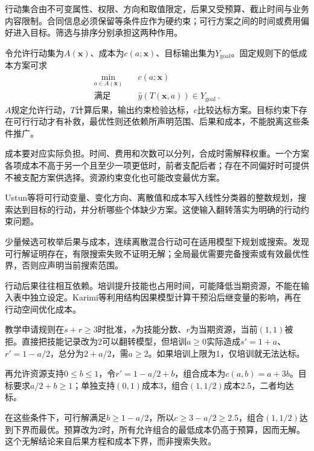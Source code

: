 行动集合由不可变属性、权限、方向和取值限定，后果又受预算、截止时间与业务内容限制。合同信息必须保留等条件应作为硬约束；可行方案之间的时间或费用偏好进入目标。筛选与排序分别承担这两种作用。

令允许行动集为$A(\bm x)$、成本为$c(a;\bm x)$、目标输出集为$Y_{\mathrm{goal}}$。固定规则下的低成本方案可求
\begin{equation}
 \begin{aligned}
 \min_{a\in A(\bm{x})}\quad &c(a;\bm{x})\\
 \text{满足}\quad &\hat y(T(\bm{x},a))\in Y_{\mathrm{goal}}\, .
 \end{aligned}
 \label{eq:interpretability-recourse}
\end{equation}
$A$规定允许行动，$T$计算后果，输出约束检验达标，$c$比较达标方案。目标约束下存在可行行动才有补救，最优性则还依赖所声明范围、后果和成本，不能脱离这些条件推广。

成本要对应实际负担。时间、费用和次数可以分列，合成时需解释权重。一个方案各项成本不高于另一个且至少一项更低时，前者支配后者；存在不同偏好时可提供不被支配方案供选择。资源约束变化也可能改变最优方案。

Ustun等将可行动变量、变化方向、离散值和成本写入线性分类器的整数规划，搜索达到目标的行动，并分析哪些个体缺少方案。这使输入翻转落实为明确的行动约束问题。

少量候选可枚举后果与成本，连续离散混合行动可在适用模型下规划或搜索。发现可行解证明存在，有限搜索失败不证明无解；全局最优需要完备搜索或有效最优性界，否则应声明当前搜索范围。

行动后果往往相互依赖。培训提升技能也占用时间，可能降低当期资源，不能在输入表中独立设定。Karimi等利用结构因果模型计算干预沿后继变量的影响，再在行动空间优化成本。

\begin{example}[约束与成本决定补救方案]
\label{ex:interpretability-causal-recourse}
教学申请规则在$s+r\geq3$时批准，$s$为技能分数、$r$为当期资源，当前$(1,1)$被拒。直接把技能记录改为2可以翻转模型，但培训$a\geq0$实际造成$s'=1+a$、$r'=1-a/2$，总分为$2+a/2$，需$a\geq2$。如果培训上限为1，仅培训就无法达标。

再允许资源支持$0\leq b\leq1$，令$r'=1-a/2+b$，组合成本为$c(a,b)=a+3b$。目标要求$a/2+b\geq1$；单独支持$(0,1)$成本3，组合$(1,1/2)$成本2.5，二者均达标。

在这些条件下，可行解满足$b\geq1-a/2$，所以$c\geq3-a/2\geq2.5$，组合$(1,1/2)$达到下界而最优。预算改为2时，所有允许组合的最低成本仍高于预算，因而无解。这个无解结论来自后果方程和成本下界，而非搜索失败。
\end{example}


